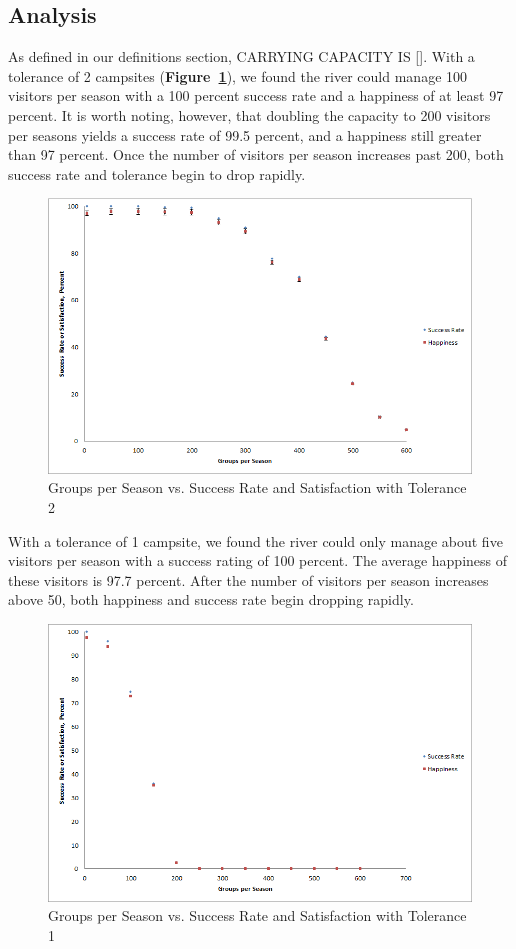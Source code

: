 \documentclass[11pt]{article} %
\begin{document}
\subsection{Analysis}
\label{sec:capacity}
As defined in our definitions section, CARRYING CAPACITY IS []. With a
tolerance of 2 campsites (\textbf{Figure~\ref{fig:visitors-t2}}), we found the river could manage 100 visitors per
season with a 100 percent success rate and a happiness of at least 97 percent.
It is worth noting, however, that doubling the capacity to 200 visitors per
seasons yields a success rate of 99.5 percent, and a happiness still greater
than 97 percent. Once the number of visitors per season increases past 200,
both success rate and tolerance begin to drop rapidly.
\begin{figure}[h]
  \centering
  \includegraphics[scale=.6]{imgs/Graph_VistorsChanges_Tolerance2.png}
  \caption{Groups per Season vs. Success Rate and Satisfaction with Tolerance 2}
  \label{fig:visitors-t2}
\end{figure}
With a tolerance of 1 campsite, we found the river could only manage about
five visitors per season with a success rating of 100 percent. The average
happiness of these visitors is 97.7 percent. After the number of visitors per
season increases above 50, both happiness and success rate begin dropping
rapidly.
\begin{figure}[h]
  \centering
  \includegraphics[scale=.6]{imgs/Graph_VistorsChanges_Tolerance1.png}
  \caption{Groups per Season vs. Success Rate and Satisfaction with Tolerance 1}
  \label{fig:visitors-t1}
\end{figure}
\end{document}
